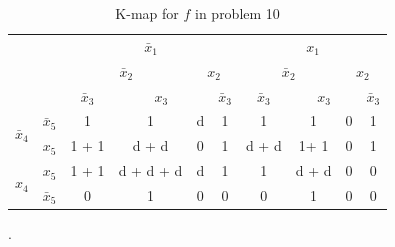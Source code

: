 \documentclass[twocolumn]{article}
\newcommand{\bx}{\bar{x}}
\newcommand{\cred}{\color{red}}
\newcommand{\cg}{\color{green}}
\newcommand{\cb}{\color{blue}}
\begin{document}
\begin{table}
  \centering
  \begin{tabular}{c|c|c|c|c|c|c|c|c|c}
  \toprule
  && \multicolumn{4}{c|}{$\bx_1$} & \multicolumn{4}{c}{$x_1$}
    \\
    && \multicolumn{2}{c|}{$\bx_2$} & \multicolumn{2}{c|}{$x_2$}
               & \multicolumn{2}{c|}{$\bx_2$} & \multicolumn{2}{c}{$x_2$}
  \\
  && $\bx_3$ & \multicolumn{2}{c|}{$x_3$} & $\bx_3$
              & $\bx_3$ & \multicolumn{2}{c|}{$x_3$} & $\bx_3$
  \\ \midrule
  \multirow{2}{*}{$\bx_4$} & $\bx_5$
                                  & \cg 1 & \cred 1 & d & \cg 1
                                              & \cg 1 & \cred 1 &  0 & \cg 1
  \\
  & $x_5$
                                  & \cg 1 + \color{cyan} 1 & \cred d  + \color{cyan} d & 0 & \cg 1
                                              & \cg d + \color{cyan} d & \cred 1+ \color{cyan} 1  &  0 & \cg 1
  \\
  \multirow{2}{*}{$x_4$}   &  $x_5$
                                  & \cb 1 + \color{cyan} 1 & \cred d + \cb d + \color{cyan} d & \cb d & \cb 1
                                              & \color{cyan} 1 & \cred d + \color{cyan} d  &  0 & 0
  \\
  & $\bx_5$
                                  & 0 & \cred 1 & 0 & 0
                                              & 0 & \cred 1 &  0 & 0
  \\\bottomrule
\end{tabular}.
\caption{K-map for $f$ in problem 10}
\label{tab:prob10}
\end{table}
\end{document}
